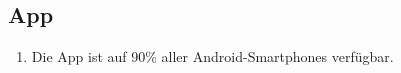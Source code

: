 \subsection*{App}

\begin{samepage}
    \begin{enumerate}[label=\textbf{/NFV\arabic*0/}, align=left]
        \item Die App ist auf 90\% aller \Gls{Android}-\Glspl{Smartphone} verfügbar.
    \end{enumerate}
\end{samepage}